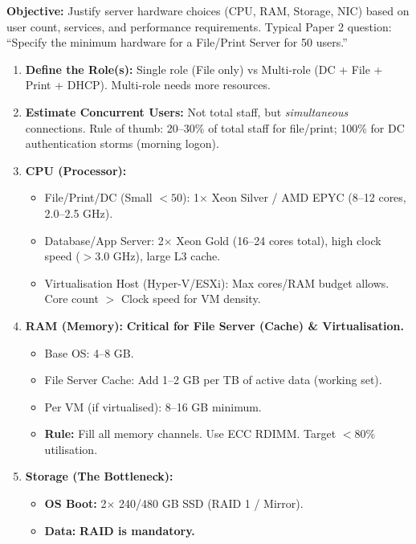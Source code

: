 \documentclass[11pt]{article}
\begin{document}
\begin{methode}
\textbf{Objective:} Justify server hardware choices (CPU, RAM, Storage, NIC) based on user count, services, and performance requirements. Typical Paper 2 question: ``Specify the minimum hardware for a File/Print Server for 50 users.''

\begin{enumerate}
    \item \textbf{Define the Role(s):} Single role (File only) vs Multi-role (DC + File + Print + DHCP). Multi-role needs more resources.
    \item \textbf{Estimate Concurrent Users:} Not total staff, but \emph{simultaneous} connections. Rule of thumb: 20--30\% of total staff for file/print; 100\% for DC authentication storms (morning logon).
    \item \textbf{CPU (Processor):}
    \begin{itemize}
        \item File/Print/DC (Small $<50$): 1$\times$ Xeon Silver / AMD EPYC (8--12 cores, 2.0--2.5 GHz).
        \item Database/App Server: 2$\times$ Xeon Gold (16--24 cores total), high clock speed ($>3.0$ GHz), large L3 cache.
        \item Virtualisation Host (Hyper-V/ESXi): Max cores/RAM budget allows. Core count $>$ Clock speed for VM density.
    \end{itemize}
    \item \textbf{RAM (Memory):} \textbf{Critical for File Server (Cache) \& Virtualisation.}
    \begin{itemize}
        \item Base OS: 4--8 GB.
        \item File Server Cache: Add 1--2 GB per TB of active data (working set).
        \item Per VM (if virtualised): 8--16 GB minimum.
        \item \textbf{Rule:} Fill all memory channels. Use ECC RDIMM. Target $< 80\%$ utilisation.
    \end{itemize}
    \item \textbf{Storage (The Bottleneck):}
    \begin{itemize}
        \item \textbf{OS Boot:} 2$\times$ 240/480 GB SSD (RAID 1 / Mirror).
        \item \textbf{Data:} \textbf{RAID is mandatory.}
        \begin{itemize}

\end{itemize}
\end{itemize}
\end{enumerate}
\end{methode}
\end{document}

